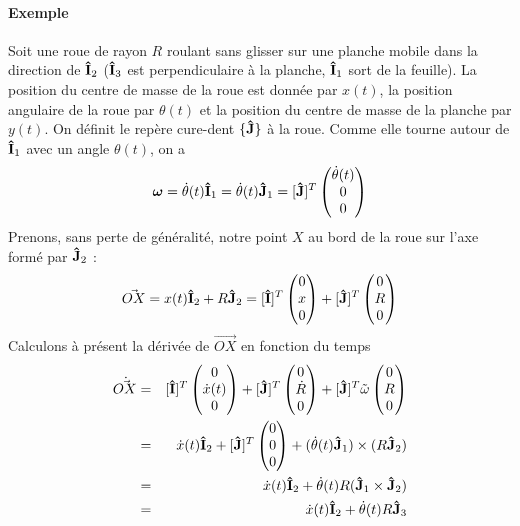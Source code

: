\paragraph{Exemple}
Soit une roue de rayon $R$ roulant sans glisser sur une planche mobile dans la direction de ${\bf\hat{I}}_2$
(${\bf\hat{I}}_3$ est perpendiculaire à la planche, ${\bf\hat{I}}_1$ sort de la feuille). 
La position du centre de masse de la roue est donnée par $x(t)$, la position angulaire de la roue par 
$\theta(t)$ et la position du centre de masse de la planche par $y(t)$.
On définit le repère cure-dent $\{{\bf\hat{J}}\}$ à la roue.
Comme elle tourne autour de ${\bf\hat{I}}_1$ avec un angle $\theta(t)$, on a
\[ {\bm \omega} = \dot{\theta}(t) {\bf\hat{I}}_1 = \dot{\theta}(t) {\bf\hat{J}}_1 = [{\bf\hat{J}}]^T
  \begin{pmatrix}
    \dot{\theta}(t)\\0\\0
\end{pmatrix} \]
Prenons, sans perte de généralité, notre point $X$ au bord de la roue sur l'axe formé par ${\bf\hat{J}}_2$ :
\[ \vec{OX} = x(t){\bf\hat{I}}_2 + R{\bf\hat{J}}_2 = [{\bf\hat{I}}]^T
  \begin{pmatrix}
    0\\x\\0
	\end{pmatrix}
 + [{\bf\hat{J}}]^T
  \begin{pmatrix}
    0\\R\\0
	\end{pmatrix} \]
Calculons à présent la dérivée de $\vec{OX}$ en fonction du temps
\begin{eqnarray*}
\dot{\vec{ OX}} &=& [{\bf\hat{I}}]^T \begin{pmatrix}0\\\dot{x}(t)\\0\end{pmatrix} + [{\bf\hat{J}}]^T \begin{pmatrix}0\\\dot{R}\\0\end{pmatrix} + [{\bf\hat{J}}]^T \tilde{\omega} \begin{pmatrix}0\\R\\0\end{pmatrix}\\
          &=& \dot{x}(t){\bf\hat{I}}_2 + [{\bf\hat{J}}]^T \begin{pmatrix}0\\0\\0\end{pmatrix} + (\dot{\theta}(t) {\bf\hat{J}}_1) \times (R {\bf\hat{J}}_2)\\
          &=& \dot{x}(t){\bf\hat{I}}_2 + \dot{\theta}(t) R ({\bf\hat{J}}_1 \times {\bf\hat{J}}_2)\\
          &=& \dot{x}(t){\bf\hat{I}}_2 + \dot{\theta}(t) R {\bf\hat{J}}_3\\
\end{eqnarray*}
